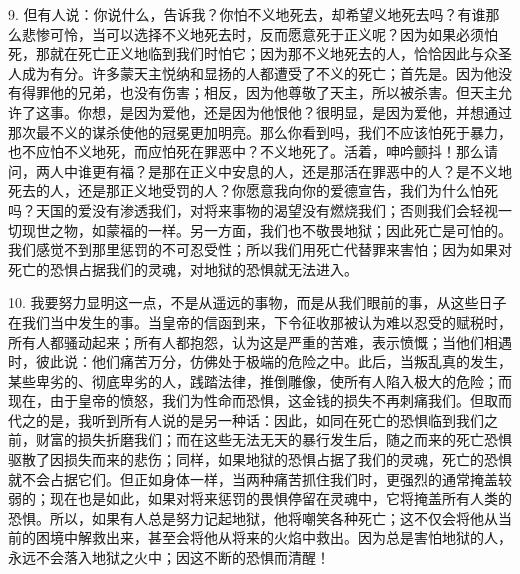 9. 但有人说：你说什么，告诉我？你怕不义地死去，却希望义地死去吗？有谁那么悲惨可怜，当可以选择不义地死去时，反而愿意死于正义呢？因为如果必须怕死，那就在死亡正义地临到我们时怕它；因为那不义地死去的人，恰恰因此与众圣人成为有分。许多蒙天主悦纳和显扬的人都遭受了不义的死亡；首先是。因为他没有得罪他的兄弟，也没有伤害；相反，因为他尊敬了天主，所以被杀害。但天主允许了这事。你想，是因为爱他，还是因为他恨他？很明显，是因为爱他，并想通过那次最不义的谋杀使他的冠冕更加明亮。那么你看到吗，我们不应该怕死于暴力，也不应怕不义地死，而应怕死在罪恶中？不义地死了。活着，呻吟颤抖！那么请问，两人中谁更有福？是那在正义中安息的人，还是那活在罪恶中的人？是不义地死去的人，还是那正义地受罚的人？你愿意我向你的爱德宣告，我们为什么怕死吗？天国的爱没有渗透我们，对将来事物的渴望没有燃烧我们；否则我们会轻视一切现世之物，如蒙福的一样。另一方面，我们也不敬畏地狱；因此死亡是可怕的。我们感觉不到那里惩罚的不可忍受性；所以我们用死亡代替罪来害怕；因为如果对死亡的恐惧占据我们的灵魂，对地狱的恐惧就无法进入。\par

10. 我要努力显明这一点，不是从遥远的事物，而是从我们眼前的事，从这些日子在我们当中发生的事。当皇帝的信函到来，下令征收那被认为难以忍受的赋税时，所有人都骚动起来；所有人都抱怨，认为这是严重的苦难，表示愤慨；当他们相遇时，彼此说：他们痛苦万分，仿佛处于极端的危险之中。此后，当叛乱真的发生，某些卑劣的、彻底卑劣的人，践踏法律，推倒雕像，使所有人陷入极大的危险；而现在，由于皇帝的愤怒，我们为性命而恐惧，这金钱的损失不再刺痛我们。但取而代之的是，我听到所有人说的是另一种话：因此，如同在死亡的恐惧临到我们之前，财富的损失折磨我们；而在这些无法无天的暴行发生后，随之而来的死亡恐惧驱散了因损失而来的悲伤；同样，如果地狱的恐惧占据了我们的灵魂，死亡的恐惧就不会占据它们。但正如身体一样，当两种痛苦抓住我们时，更强烈的通常掩盖较弱的；现在也是如此，如果对将来惩罚的畏惧停留在灵魂中，它将掩盖所有人类的恐惧。所以，如果有人总是努力记起地狱，他将嘲笑各种死亡；这不仅会将他从当前的困境中解救出来，甚至会将他从将来的火焰中救出。因为总是害怕地狱的人，永远不会落入地狱之火中；因这不断的恐惧而清醒！\par

